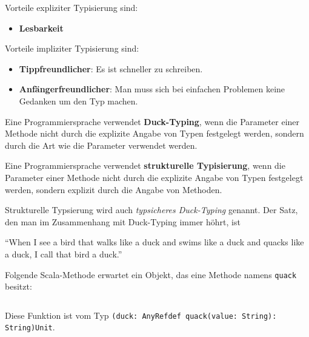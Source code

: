 Vorteile expliziter Typisierung sind:

\begin{itemize}
    \item \textbf{Lesbarkeit}
\end{itemize}

Vorteile impliziter Typisierung sind:

\begin{itemize}
    \item \textbf{Tippfreundlicher}: Es ist schneller zu schreiben.
    \item \textbf{Anfängerfreundlicher}: Man muss sich bei einfachen Problemen
          keine Gedanken um den Typ machen.
\end{itemize}

\begin{definition}%
    \begin{defenum}
        \item Eine Programmiersprache verwendet \textbf{Duck-Typing}, wenn die Parameter einer 
              Methode nicht durch die explizite Angabe von Typen festgelegt werden, sondern
              durch die Art wie die Parameter verwendet werden.
        \item Eine Programmiersprache verwendet \textbf{strukturelle Typisierung}, wenn die
              Parameter einer Methode nicht durch die explizite Angabe von Typen
              festgelegt werden, sondern explizit durch die Angabe von Methoden.
    \end{defenum}
\end{definition}

Strukturelle Typsierung wird auch \textit{typsicheres Duck-Typing} genannt. 
Der Satz, den man im Zusammenhang mit Duck-Typing immer höhrt, ist

\enquote{When I see a bird that walks like a duck and swims like a duck and quacks like a duck, I call that bird a duck.}

\begin{beispiel}
    Folgende Scala-Methode erwartet ein Objekt, das eine Methode namens \texttt{quack}
    besitzt:

    \inputminted[numbersep=5pt, tabsize=4]{scala}{scripts/scala/duck-typing-example.scala}

    Diese Funktion ist vom Typ \texttt{(duck: AnyRef{def quack(value: String): String})Unit}.
\end{beispiel}

